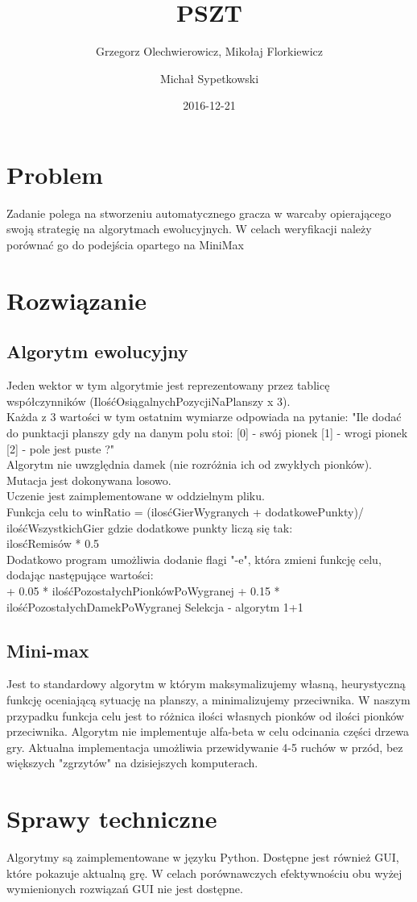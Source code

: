 \documentclass{article}
\title{PSZT}
\date{2016-12-21}
\author{Grzegorz Olechwierowicz, Mikołaj Florkiewicz\and Michał Sypetkowski}
\begin{document}
\maketitle
{}
\newpage
{}
\section{Problem}

Zadanie polega na stworzeniu automatycznego gracza w warcaby opierającego swoją strategię
na algorytmach ewolucyjnych. W celach weryfikacji należy porównać go do podejścia
opartego na MiniMax

\section{Rozwiązanie}

\subsection{Algorytm ewolucyjny}

Jeden wektor w tym algorytmie jest reprezentowany przez tablicę współczynników (IlośćOsiągalnychPozycjiNaPlanszy x 3).\\
Każda z 3 wartości w tym ostatnim wymiarze odpowiada na pytanie: "Ile dodać do punktacji planszy gdy na danym polu stoi:
[0] - swój pionek
[1] - wrogi pionek
[2] - pole jest puste ?"\\
Algorytm nie uwzględnia damek (nie rozróżnia ich od zwykłych pionków).
Mutacja jest dokonywana losowo.
\\
Uczenie jest zaimplementowane w oddzielnym pliku.\\
Funkcja celu to winRatio = (ilosćGierWygranych + dodatkowePunkty)/\\ilośćWszystkichGier
gdzie dodatkowe punkty liczą się tak:\\
ilosćRemisów * 0.5\\
Dodatkowo program umożliwia dodanie flagi "-e", która zmieni funkcję celu, dodając następujące wartości:\\
+ 0.05 * ilośćPozostałychPionkówPoWygranej
+ 0.15 * ilośćPozostałychDamekPoWygranej
Selekcja - algorytm 1+1 

\subsection{Mini-max}

Jest to standardowy algorytm w którym maksymalizujemy własną, heurystyczną funkcję oceniającą sytuację na planszy, a minimalizujemy przeciwnika. W naszym przypadku funkcja celu jest to różnica ilości własnych pionków od ilości pionków przeciwnika. Algorytm nie implementuje alfa-beta w celu odcinania części drzewa gry. Aktualna implementacja umożliwia przewidywanie 4-5 ruchów w przód, bez większych "zgrzytów" na dzisiejszych komputerach. 

\section{Sprawy techniczne}

Algorytmy są zaimplementowane w języku Python. Dostępne jest również GUI, które pokazuje aktualną grę. W celach porównawczych efektywnościu obu wyżej wymienionych rozwiązań GUI nie jest dostępne.   
\end{document}
